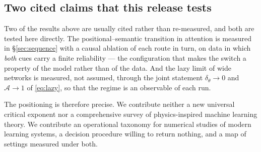\subsection{Two cited claims that this release tests}

Two of the results above are usually cited rather than re-measured, and both are
tested here directly. The positional--semantic transition in attention
\cite{cui2024phase} is measured in \S\ref{sec:sequence} with a causal ablation
of each route in turn, on data in which \emph{both} cues carry a finite
reliability --- the configuration that makes the switch a property of the model
rather than of the data. And the lazy limit of wide networks
\cite{jacot2018neural} is measured, not assumed, through the joint statement
$\delta_\theta\to0$ and $\mathcal A\to1$ of \eqref{eq:lazy}, so that the
regime is an observable of each run.

The positioning is therefore precise. We contribute neither a new universal
critical exponent nor a comprehensive survey of physics-inspired machine
learning theory. We contribute an operational taxonomy for numerical studies of
modern learning systems, a decision procedure willing to return nothing, and a
map of \AtlasTotalFamilies{} settings measured under both.

\FloatBarrier
